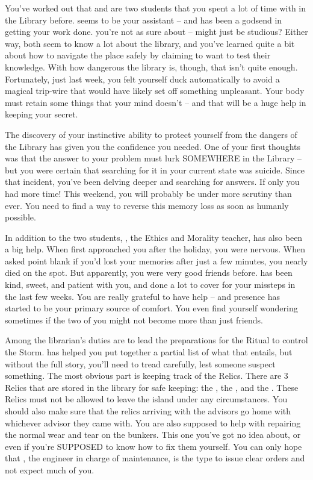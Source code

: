 \documentclass[char]{GL2020}
\begin{document}
You’ve worked out that \cPresident{} and \cLibAssist{} are two students that you spent a lot of time with in the Library before. \cLibAssist{} seems to be your assistant -- and has been a godsend in getting your work done. \cPresident{} you’re not as sure about -- \cPresident{\they} might just be studious? Either way, both seem to know a lot about the library, and you’ve learned quite a bit about how to navigate the place safely by claiming to want to test their knowledge. With how dangerous the library is, though, that isn’t quite enough. Fortunately, just last week, you felt yourself duck automatically to avoid a magical trip-wire that would have likely set off something unpleasant. Your body must retain some things that your mind doesn’t -- and that will be a huge help in keeping your secret.

The discovery of your instinctive ability to protect yourself from the dangers of the Library has given you the confidence you needed. One of your first thoughts was that the answer to your problem must lurk SOMEWHERE in the Library -- but you were certain that searching for it in your current state was suicide. Since that incident, you’ve been delving deeper and searching for answers. If only you had more time! This weekend, you will probably be under more scrutiny than ever. You need to find a way to reverse this memory loss as soon as humanly possible.

In addition to the two students, \cEthics{}, the Ethics and Morality teacher, has also been a big help. When \cEthics{\they} first approached you after the holiday, you were nervous. When \cEthics{\they} asked point blank if you’d lost your memories after just a few minutes, you nearly died on the spot. But apparently, you were very good friends before. \cEthics{} has been kind, sweet, and patient with you, and done a lot to cover for your missteps in the last few weeks. You are really grateful to have \cEthics{\their} help -- and \cEthics{\their} presence has started to be your primary source of comfort. You even find yourself wondering sometimes if the two of you might not become more than just friends.

Among the librarian’s duties are to lead the preparations for the Ritual to control the Storm. \cEthics{} has helped you put together a partial list of what that entails, but without the full story, you’ll need to tread carefully, lest someone suspect something. The most obvious part is keeping track of the Relics. There are 3 Relics that are stored in the library for safe keeping: the \iNet{}, the \iLariat{}, and the \iScythe{}. These Relics must not be allowed to leave the island under any circumstances. You should also make sure that the relics arriving with the advisors go home with whichever advisor they came with. You are also supposed to help with repairing the normal wear and tear on the bunkers. This one you’ve got no idea about, or even if you’re SUPPOSED to know how to fix them yourself. You can only hope that \cBunker{}, the engineer in charge of maintenance, is the type to issue clear orders and not expect much of you.
\end{document}
